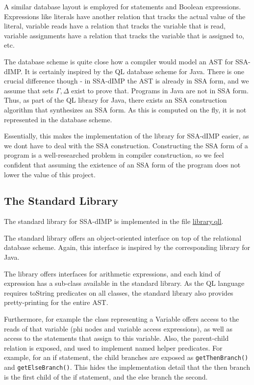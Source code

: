 A similar database layout is employed for statements and Boolean expressions.
Expressions like literals have another relation that tracks the actual value of the
literal, variable reads have a relation that tracks the variable that is read,
variable assignments have a relation that tracks the variable that is assigned to, etc.

The database scheme is quite close how a compiler would model an AST for SSA-dIMP.
It is certainly inspired by the QL database scheme for Java.
There is one crucial difference though - in SSA-dIMP the AST is already in SSA form,
and we assume that sets $\Gamma, \Delta$ exist to prove that.
Programs in Java are not in SSA form.
Thus, as part of the QL library for Java, there exists an SSA construction algorithm
that synthesizes an SSA form.
As this is computed on the fly, it is not represented in the database scheme.

Essentially, this makes the implementation of the library for SSA-dIMP easier,
as we dont have to deal with the SSA construction.
Constructing the SSA form of a program is a well-researched problem in compiler
construction, so we feel confident that assuming the existence of an SSA form 
of the program does not lower the value of this project.

\subsection{The Standard Library}
The standard library for SSA-dIMP is implemented in the file \hyperref[lst:library]{library.qll}.

The standard library offers an object-oriented interface on top of the relational
database scheme.
Again, this interface is inspired by the corresponding library for Java.

The library offers interfaces for arithmetic expressions, and each kind of expression
has a sub-class available in the standard library.
As the QL language requires toString predicates on all classes,
the standard library also provides pretty-printing for the entire AST.

Furthermore, for example the class representing a Variable offers access to the
reads of that variable (phi nodes and variable access expressions), as well
as access to the statements that assign to this variable.
Also, the parent-child relation is exposed, and used to implement named helper predicates.
For example, for an if statement, the child branches are exposed as \texttt{getThenBranch()}
and \texttt{getElseBranch()}.
This hides the implementation detail that the then branch is the first child of the
if statement, and the else branch the second.


